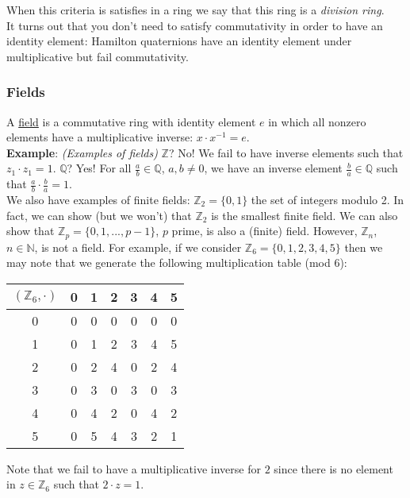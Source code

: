 \documentclass[12pt]{article}
\newlength\tindent
\renewcommand{\indent}{\hspace*{\tindent}}
\newcommand{\N}{\mathbb N}
\newcommand{\Z}{\mathbb Z}
\newcommand{\Q}{\mathbb Q}
\begin{document}
When this criteria is satisfies in a ring we say that this ring is a {\em division ring}. \\

\indent It turns out that you don't need to satisfy commutativity in order to have an identity element: Hamilton quaternions have an identity element under multiplicative but fail commutativity. 

\subsubsection{Fields}

\indent A \underline{field} is a commutative ring with identity element $e$ in which all nonzero elements have a multiplicative inverse: $x \cdot x^{-1} = e$. \\

{\bf Example}: {\em (Examples of fields)} $\Z$? No! We fail to have inverse elements such that $z_1 \cdot z_1 = 1$. $\Q$? Yes! For all $\frac{a}{b} \in \Q$, $a, b \neq 0$, we have an inverse element $\frac{b}{a} \in \Q$ such that $\frac{a}{b} \cdot \frac{b}{a} = 1$. \\

\indent We also have examples of finite fields: $\Z_2 = \{0, 1\}$ the set of integers modulo 2. In fact, we can show (but we won't) that $\Z_2$ is the smallest finite field. We can also show that $\Z_p = \{0, 1, ..., p - 1\}$, $p$ prime, is also a (finite) field. However, $\Z_n$, $n \in \N$, is not a field. For example, if we consider $\Z_6 = \{0, 1, 2, 3, 4, 5\}$ then we may note that we generate the following multiplication table (mod 6):

\begin{center}
\begin{tabular}{ c | c | c | c | c | c | c }			
  $(\Z_6, \cdot)$ & 0 & 1 & 2 & 3 & 4 & 5 \\
  \hline
  0 & 0 & 0 & 0 & 0 & 0 & 0 \\
  \hline
  1 & 0 & 1 & 2 & 3 & 4 & 5 \\
  \hline
  2 & 0 & 2 & 4 & 0 & 2 & 4 \\
  \hline
  3 & 0 & 3 & 0 & 3 & 0 & 3 \\
  \hline
  4 & 0 & 4 & 2 & 0 & 4 & 2 \\
  \hline
  5 & 0 & 5 & 4 & 3 & 2 & 1 \\
\end{tabular}
\end{center}

\indent Note that we fail to have a multiplicative inverse for $2$ since there is no element in $z \in \Z_6$ such that $2 \cdot z = 1$.
\end{document}
